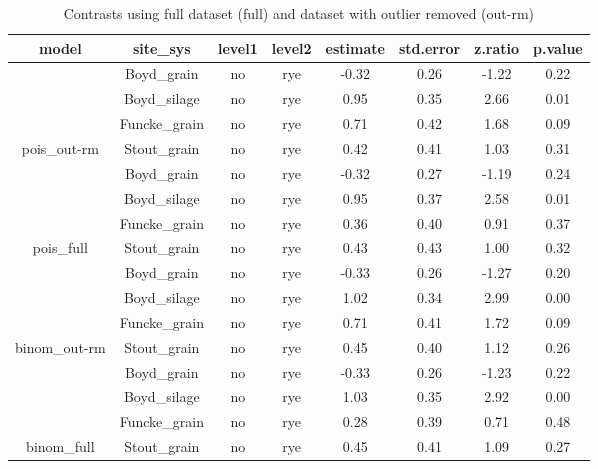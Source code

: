 \documentclass[]{article}
\begin{document}
\begin{table}[H]

\caption{\label{tab:unnamed-chunk-5}Contrasts using full dataset (full) and dataset with outlier removed (out-rm)}
\centering
\begin{tabular}[t]{cccccccc}
\toprule
model & site\_sys & level1 & level2 & estimate & std.error & z.ratio & p.value\\
\midrule
\rowcolor{gray!6}   & Boyd\_grain & no & rye & -0.32 & 0.26 & -1.22 & 0.22\\

 & Boyd\_silage & no & rye & 0.95 & 0.35 & 2.66 & 0.01\\

\rowcolor{gray!6}   & Funcke\_grain & no & rye & 0.71 & 0.42 & 1.68 & 0.09\\

\multirow{-4}{*}{\centering\arraybackslash pois\_out-rm} & Stout\_grain & no & rye & 0.42 & 0.41 & 1.03 & 0.31\\
\cmidrule{1-8}
\rowcolor{gray!6}   & Boyd\_grain & no & rye & -0.32 & 0.27 & -1.19 & 0.24\\

 & Boyd\_silage & no & rye & 0.95 & 0.37 & 2.58 & 0.01\\

\rowcolor{gray!6}   & Funcke\_grain & no & rye & 0.36 & 0.40 & 0.91 & 0.37\\

\multirow{-4}{*}{\centering\arraybackslash pois\_full} & Stout\_grain & no & rye & 0.43 & 0.43 & 1.00 & 0.32\\
\cmidrule{1-8}
\rowcolor{gray!6}   & Boyd\_grain & no & rye & -0.33 & 0.26 & -1.27 & 0.20\\

 & Boyd\_silage & no & rye & 1.02 & 0.34 & 2.99 & 0.00\\

\rowcolor{gray!6}   & Funcke\_grain & no & rye & 0.71 & 0.41 & 1.72 & 0.09\\

\multirow{-4}{*}{\centering\arraybackslash binom\_out-rm} & Stout\_grain & no & rye & 0.45 & 0.40 & 1.12 & 0.26\\
\cmidrule{1-8}
\rowcolor{gray!6}   & Boyd\_grain & no & rye & -0.33 & 0.26 & -1.23 & 0.22\\

 & Boyd\_silage & no & rye & 1.03 & 0.35 & 2.92 & 0.00\\

\rowcolor{gray!6}   & Funcke\_grain & no & rye & 0.28 & 0.39 & 0.71 & 0.48\\

\multirow{-4}{*}{\centering\arraybackslash binom\_full} & Stout\_grain & no & rye & 0.45 & 0.41 & 1.09 & 0.27\\
\bottomrule
\end{tabular}
\end{table}
\end{document}
